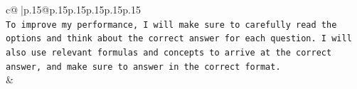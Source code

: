 \documentclass{article}
\begin{document}
{\begin{supertabular}{c@{$\;$}|p{.15\linewidth}@{}p{.15\linewidth}p{.15\linewidth}p{.15\linewidth}p{.15\linewidth}p{.15\linewidth}}
{{{\\ 
\texttt{To improve my performance, I will make sure to carefully read the options and think about the correct answer for each question. I will also use relevant formulas and concepts to arrive at the correct answer, and make sure to answer in the correct format.} \\
            }
        }
    }
    & \\ \\

\end{supertabular}
}
\end{document}
